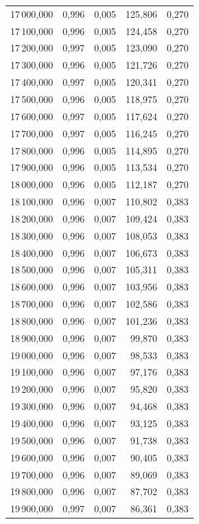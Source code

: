 \begin{longtable}{rrrrr}
17\,000,000 & 0,996 & 0,005 & 125,806 & 0,270\\
17\,100,000 & 0,996 & 0,005 & 124,458 & 0,270\\
17\,200,000 & 0,997 & 0,005 & 123,090 & 0,270\\
17\,300,000 & 0,996 & 0,005 & 121,726 & 0,270\\
17\,400,000 & 0,997 & 0,005 & 120,341 & 0,270\\
17\,500,000 & 0,996 & 0,005 & 118,975 & 0,270\\
17\,600,000 & 0,997 & 0,005 & 117,624 & 0,270\\
17\,700,000 & 0,997 & 0,005 & 116,245 & 0,270\\
17\,800,000 & 0,996 & 0,005 & 114,895 & 0,270\\
17\,900,000 & 0,996 & 0,005 & 113,534 & 0,270\\
18\,000,000 & 0,996 & 0,005 & 112,187 & 0,270\\
18\,100,000 & 0,996 & 0,007 & 110,802 & 0,383\\
18\,200,000 & 0,996 & 0,007 & 109,424 & 0,383\\
18\,300,000 & 0,996 & 0,007 & 108,053 & 0,383\\
18\,400,000 & 0,996 & 0,007 & 106,673 & 0,383\\
18\,500,000 & 0,996 & 0,007 & 105,311 & 0,383\\
18\,600,000 & 0,996 & 0,007 & 103,956 & 0,383\\
18\,700,000 & 0,996 & 0,007 & 102,586 & 0,383\\
18\,800,000 & 0,996 & 0,007 & 101,236 & 0,383\\
18\,900,000 & 0,996 & 0,007 & 99,870 & 0,383\\
19\,000,000 & 0,996 & 0,007 & 98,533 & 0,383\\
19\,100,000 & 0,996 & 0,007 & 97,176 & 0,383\\
19\,200,000 & 0,996 & 0,007 & 95,820 & 0,383\\
19\,300,000 & 0,996 & 0,007 & 94,468 & 0,383\\
19\,400,000 & 0,996 & 0,007 & 93,125 & 0,383\\
19\,500,000 & 0,996 & 0,007 & 91,738 & 0,383\\
19\,600,000 & 0,996 & 0,007 & 90,405 & 0,383\\
19\,700,000 & 0,996 & 0,007 & 89,069 & 0,383\\
19\,800,000 & 0,996 & 0,007 & 87,702 & 0,383\\
19\,900,000 & 0,997 & 0,007 & 86,361 & 0,383\\

\end{longtable}
